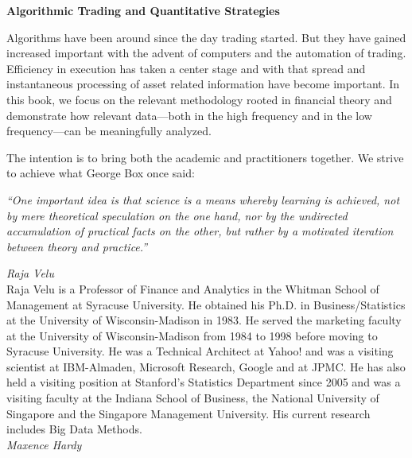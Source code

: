 
\begin{center} {\large\bfseries Algorithmic Trading and Quantitative Strategies} \end{center}

Algorithms have been around since the day trading started. But they have gained increased important with the advent of computers and the automation of trading. Efficiency in execution has taken a center stage and with that spread and instantaneous processing of asset related information have become important. In this book, we focus on the relevant methodology rooted in financial theory and demonstrate how relevant data---both in the high frequency and in the low frequency---can be meaningfully analyzed. 


The intention is to bring both the academic and practitioners together. We strive to achieve what George Box once said: \par
\begin{center}
\begin{minipage}[t]{0.7\textwidth}
	\raggedright
  	{\itshape``One important idea is that science is a means whereby learning is achieved, not by mere theoretical speculation on the one hand, nor by the undirected accumulation of practical facts on the other, but rather by a motivated iteration between theory and practice.''}
\end{minipage} 
\end{center}


\newpage


{\noindent\large\itshape Raja Velu} \\[0.2cm]
\noindent Raja Velu is a Professor of Finance and Analytics in the Whitman School of Management at Syracuse University. He obtained his Ph.D. in Business/Statistics at the University of Wisconsin-Madison in 1983. He served the marketing faculty at the University of Wisconsin-Madison from 1984 to 1998 before moving to Syracuse University. He was a Technical Architect at Yahoo! and was a visiting scientist at IBM-Almaden, Microsoft Research, Google and at JPMC. He has also held a visiting position at Stanford's Statistics Department since 2005 and was a visiting faculty at the Indiana School of Business, the National University of Singapore and the Singapore Management University. His current research includes Big Data Methods. \\


{\noindent\large\itshape Maxence Hardy} \\[0.2cm]


